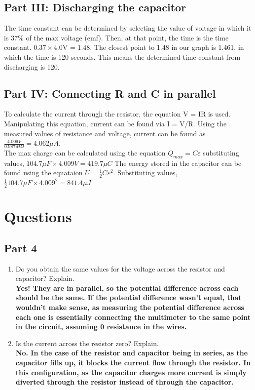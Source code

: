 \documentclass[titlepage]{article}
\begin{document}
	\subsection{Part III: Discharging the capacitor}
	The time constant can be determined by selecting the value of voltage in which it is 37\% of the max voltage (emf). Then, at that point, the time is the time constant. $0.37 \times 4.0$V = $1.48$. The closest point to 1.48 in our graph is 1.461, in which the time is 120 seconds. This means the determined time constant from discharging is 120.
	\subsection{Part IV: Connecting R and C in parallel}
	To calculate the current through the resistor, the equation V = IR is used. Manipulating this equation, current can be found via I = V/R. Using the measured values of resistance and voltage, current can be found as $\frac{4.009V}{0.987M\Omega} = 4.062\mu A$.\\
	The max charge can be calculated using the equation $Q_{max} = C\varepsilon$ substituting values, $104.7\mu F \times 4.009V = 419.7\mu C$
	The energy stored in the capacitor can be found using the equataion $U = \frac{1}{2}C\varepsilon^2$. Substituting values, $\frac{1}{2}104.7\mu F \times 4.009^2 = 841.4\mu J$
	\section{Questions}
    \subsection{Part 4}
    \begin{enumerate}
        \item Do you obtain the same values for the voltage across the resistor and capacitor? Explain.\\ 
            \textbf{Yes! They are in parallel, so the potential difference across each should be the same. If the potential difference wasn’t equal, that wouldn’t make sense, as measuring the potential difference across each one is essentially connecting the multimeter to the same point in the circuit, assuming 0 resistance in the wires.}
        \item Is the current across the resistor zero? Explain.\\ 
            \textbf{No. In the case of the resistor and capacitor being in series, as the capacitor fills up, it blocks the current flow through the resistor. In this configuration, as the capacitor charges more current is simply diverted through the resistor instead of through the capacitor.}



    \end{enumerate}
\end{document}
